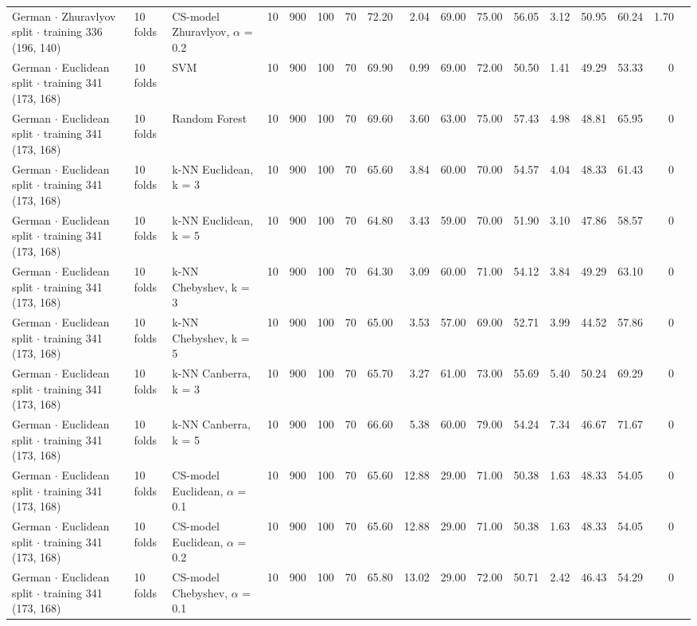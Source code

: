\begin{longtable}{lllrrrrrrrrrrrrrl}
  German $\cdot$ Zhuravlyov split $\cdot$ training 336 (196, 140) & 10 folds & CS-model Zhuravlyov, $\alpha$ = 0.2 & 10 & 900 & 100 & 70 & 72.20 & 2.04 & 69.00 & 75.00 & 56.05 & 3.12 & 50.95 & 60.24 & 1.70 &  \\
  German $\cdot$ Euclidean split $\cdot$ training 341 (173, 168) & 10 folds & SVM & 10 & 900 & 100 & 70 & 69.90 & 0.99 & 69.00 & 72.00 & 50.50 & 1.41 & 49.29 & 53.33 & 0 &  \\
  German $\cdot$ Euclidean split $\cdot$ training 341 (173, 168) & 10 folds & Random Forest & 10 & 900 & 100 & 70 & 69.60 & 3.60 & 63.00 & 75.00 & 57.43 & 4.98 & 48.81 & 65.95 & 0 &  \\
  German $\cdot$ Euclidean split $\cdot$ training 341 (173, 168) & 10 folds & k-NN Euclidean, k = 3 & 10 & 900 & 100 & 70 & 65.60 & 3.84 & 60.00 & 70.00 & 54.57 & 4.04 & 48.33 & 61.43 & 0 &  \\
  German $\cdot$ Euclidean split $\cdot$ training 341 (173, 168) & 10 folds & k-NN Euclidean, k = 5 & 10 & 900 & 100 & 70 & 64.80 & 3.43 & 59.00 & 70.00 & 51.90 & 3.10 & 47.86 & 58.57 & 0 &  \\
  German $\cdot$ Euclidean split $\cdot$ training 341 (173, 168) & 10 folds & k-NN Chebyshev, k = 3 & 10 & 900 & 100 & 70 & 64.30 & 3.09 & 60.00 & 71.00 & 54.12 & 3.84 & 49.29 & 63.10 & 0 &  \\
  German $\cdot$ Euclidean split $\cdot$ training 341 (173, 168) & 10 folds & k-NN Chebyshev, k = 5 & 10 & 900 & 100 & 70 & 65.00 & 3.53 & 57.00 & 69.00 & 52.71 & 3.99 & 44.52 & 57.86 & 0 &  \\
  German $\cdot$ Euclidean split $\cdot$ training 341 (173, 168) & 10 folds & k-NN Canberra, k = 3 & 10 & 900 & 100 & 70 & 65.70 & 3.27 & 61.00 & 73.00 & 55.69 & 5.40 & 50.24 & 69.29 & 0 &  \\
  German $\cdot$ Euclidean split $\cdot$ training 341 (173, 168) & 10 folds & k-NN Canberra, k = 5 & 10 & 900 & 100 & 70 & 66.60 & 5.38 & 60.00 & 79.00 & 54.24 & 7.34 & 46.67 & 71.67 & 0 &  \\
  German $\cdot$ Euclidean split $\cdot$ training 341 (173, 168) & 10 folds & CS-model Euclidean, $\alpha$ = 0.1 & 10 & 900 & 100 & 70 & 65.60 & 12.88 & 29.00 & 71.00 & 50.38 & 1.63 & 48.33 & 54.05 & 0 &  \\
  German $\cdot$ Euclidean split $\cdot$ training 341 (173, 168) & 10 folds & CS-model Euclidean, $\alpha$ = 0.2 & 10 & 900 & 100 & 70 & 65.60 & 12.88 & 29.00 & 71.00 & 50.38 & 1.63 & 48.33 & 54.05 & 0 &  \\
  German $\cdot$ Euclidean split $\cdot$ training 341 (173, 168) & 10 folds & CS-model Chebyshev, $\alpha$ = 0.1 & 10 & 900 & 100 & 70 & 65.80 & 13.02 & 29.00 & 72.00 & 50.71 & 2.42 & 46.43 & 54.29 & 0 &  \\

\end{longtable}
